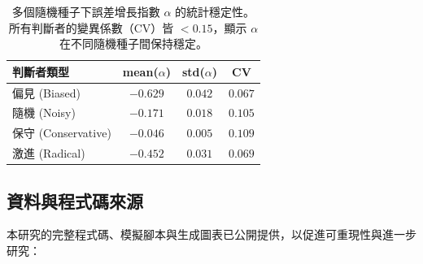 \documentclass[12pt,a4paper]{article}
\theoremstyle{definition}
\theoremstyle{remark}
\begin{document}
\begin{table}[htbp]
\centering
\caption{多個隨機種子下誤差增長指數 $\alpha$ 的統計穩定性。所有判斷者的變異係數（CV）皆 $< 0.15$，顯示 $\alpha$ 在不同隨機種子間保持穩定。}
\label{tab:seed_stability_zh}
\begin{tabular}{lccc}
\toprule
\textbf{判斷者類型} & \textbf{mean($\alpha$)} & \textbf{std($\alpha$)} & \textbf{CV} \\
\midrule
偏見 (Biased)       & $-0.629$ & $0.042$ & $0.067$ \\
隨機 (Noisy)        & $-0.171$ & $0.018$ & $0.105$ \\
保守 (Conservative) & $-0.046$ & $0.005$ & $0.109$ \\
激進 (Radical)      & $-0.452$ & $0.031$ & $0.069$ \\
\bottomrule
\end{tabular}
\end{table}

\subsection{資料與程式碼來源}

本研究的完整程式碼、模擬腳本與生成圖表已公開提供，以促進可重現性與進一步研究：
\end{document}
